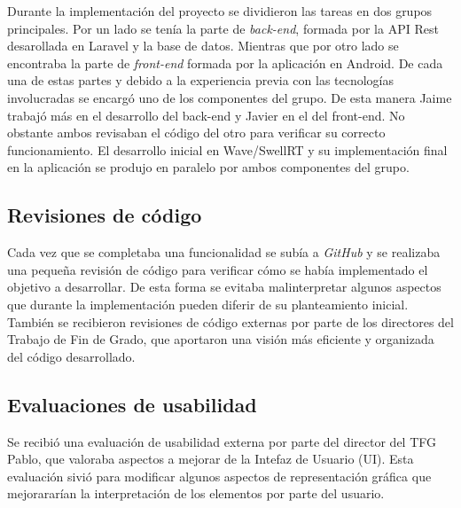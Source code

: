 Durante la implementación del proyecto se dividieron las tareas en dos grupos principales. Por un lado se tenía la parte de \textit{back-end}, formada por la API Rest desarollada en Laravel y la base de datos. Mientras que por otro lado se encontraba la parte de \textit{front-end} formada por la aplicación en Android. De cada una de estas partes y debido a la experiencia previa con las tecnologías involucradas se encargó uno de los componentes del grupo. De esta manera Jaime trabajó más en el desarrollo del back-end y Javier en el del front-end. No obstante ambos revisaban el código del otro para verificar su correcto funcionamiento. El desarrollo inicial en Wave/SwellRT y su implementación final en la aplicación se produjo en paralelo por ambos componentes del grupo.

\subsection{Revisiones de código}

Cada vez que se completaba una funcionalidad se subía a \textit{GitHub} y se realizaba una pequeña revisión de código para verificar cómo se había implementado el objetivo a desarrollar. De esta forma se evitaba malinterpretar algunos aspectos que durante la implementación pueden diferir de su planteamiento inicial. También se recibieron revisiones de código externas por parte de los directores del Trabajo de Fin de Grado, que aportaron una visión más eficiente y organizada del código desarrollado.

\subsection{Evaluaciones de usabilidad}

Se recibió una evaluación de usabilidad externa por parte del director del TFG Pablo, que valoraba aspectos a mejorar de la Intefaz de Usuario (UI). Esta evaluación sivió para modificar algunos aspectos de representación gráfica que mejorararían la interpretación de los elementos por parte del usuario.

